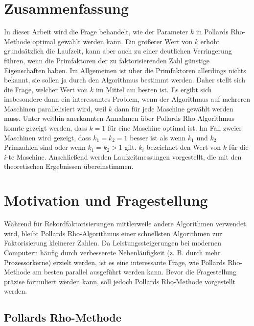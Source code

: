 \documentclass[a4paper, 10pt, ngerman]{article}
\begin{document}
\newpage

\section{Zusammenfassung}

In dieser Arbeit wird die Frage behandelt, wie der Parameter $k$ in Pollards Rho-Methode optimal gewählt werden kann. Ein größerer Wert von $k$ erhöht grundsätzlich die Laufzeit, kann aber auch zu einer deutlichen Verringerung führen, wenn die Primfaktoren der zu faktorisierenden Zahl günstige Eigenschaften haben. Im Allgemeinen ist über die Primfaktoren allerdings nichts bekannt, sie sollen ja durch den Algorithmus bestimmt werden. Daher stellt sich die Frage, welcher Wert von $k$ im Mittel am besten ist. Es ergibt sich insbesondere dann ein interessantes Problem, wenn der Algorithmus auf mehreren Maschinen parallelisiert wird, weil $k$ dann für jede Maschine gewählt werden muss. Unter weithin anerkannten Annahmen über Pollards Rho-Algorithmus konnte gezeigt werden, dass $k = 1$ für eine Maschine optimal ist. Im Fall zweier Maschinen wird gezeigt, dass $k_1 = k_2 = 1$ besser ist als wenn $k_1$ und $k_2$ Primzahlen sind oder wenn $k_1 = k_2 > 1$ gilt. $k_i$ bezeichnet den Wert von $k$ für die $i$-te Maschine. Anschließend werden Laufzeitmessungen vorgestellt, die mit den theoretischen Ergebnissen übereinstimmen.

\section{Motivation und Fragestellung}

Während für Rekordfaktorisierungen mittlerweile andere Algorithmen verwendet wird, bleibt Pollards Rho-Algorithmus einer schnellsten Algorithmen zur Faktorisierung kleinerer Zahlen. Da Leistungssteigerungen bei modernen Computern häufig durch verbesserete Nebenläufigkeit (z. B. durch mehr Prozessorkerne) erzielt werden, ist es eine interessante Frage, wie Pollards Rho-Methode am besten parallel ausgeführt werden kann. Bevor die Fragestellung präzise formuliert werden kann, soll jedoch Pollards Rho-Methode vorgestellt werden.

\subsection{Pollards Rho-Methode}
\end{document}
